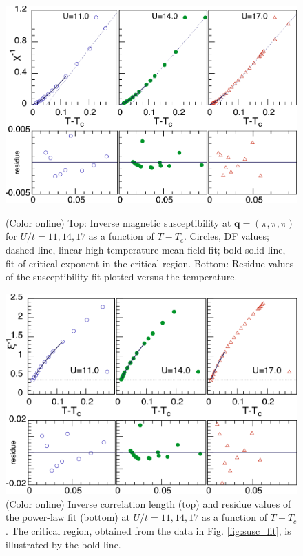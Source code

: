 \documentclass[aps,prb,twocolumn,amsmath,notitlepage,floatfix,footinbib,superscriptaddress,showpacs, showkeys]{revtex4-1}
\newcommand{\cue}{\mathbf{q}}
\begin{document}
\begin{appendix}
\begin{figure}[ht]
\begin{center}\includegraphics[width=\columnwidth]{app_fig1a.pdf}\end{center}\vspace*{-1.5em}
\caption{(Color online) Top: Inverse magnetic susceptibility at $\cue=(\pi,\pi,\pi)$ for $U/t=11, 14, 17$ as a function of $T-T_c$. Circles, DF values; dashed line, linear high-temperature mean-field fit; bold solid line, fit of critical exponent in the critical region. Bottom: Residue values of the susceptibility fit plotted versus the temperature.}
\label{fig:susc_fit}
\begin{center}\includegraphics[width=\columnwidth]{app_fig1b.pdf}\end{center}\vspace*{-1.5em}
\caption{(Color online) Inverse correlation length (top) and residue values of the power-law fit (bottom) at $U/t=11, 14, 17$ as a function of $T-T_c$. The critical region, obtained from the data in Fig. \ref{fig:susc_fit}, is illustrated by the bold line.}
\label{fig:corr_fit}
\end{figure}


\end{appendix}
\end{document}
